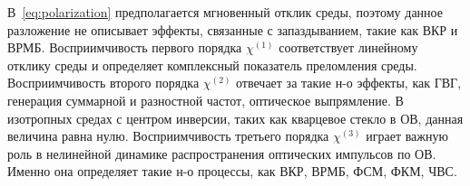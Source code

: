 

В~\cref{eq:polarization} предполагается мгновенный отклик среды, поэтому данное разложение не описывает эффекты, связанные с запаздыванием, такие как ВКР и ВРМБ. Восприимчивость первого порядка $\chi^{(1)}$ соответствует линейному отклику среды и определяет комплексный показатель преломления среды. Восприимчивость второго порядка $\chi^{(2)}$ отвечает за такие н-о эффекты, как ГВГ, генерация суммарной и разностной частот, оптическое выпрямление. В изотропных средах с центром инверсии, таких как кварцевое стекло в ОВ, данная величина равна нулю. Восприимчивость третьего порядка $\chi^{(3)}$ играет важную роль в нелинейной динамике распространения оптических импульсов по ОВ. Именно она определяет такие н-о процессы, как ВКР, ВРМБ, ФСМ, ФКМ, ЧВС.


